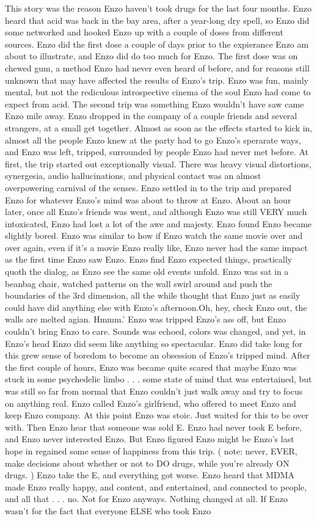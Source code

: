 \documentclass[12pt]{book}
\begin{document}
This story was the reason Enzo haven't took drugs for the last four months. Enzo heard that acid was back in the bay area, after a year-long dry spell, so Enzo did some networked and hooked Enzo up with a couple of doses from different sources. Enzo did the first dose a couple of days prior to the expierance Enzo am about to illustrate, and Enzo did do too much for Enzo. The first dose was on chewed gum, a method Enzo had never even heard of before, and for reasons still unknown that may have affected the results of Enzo's trip. Enzo was fun, mainly mental, but not the rediculous introspective cinema of the soul Enzo had come to expect from acid. The second trip was something Enzo wouldn't have saw came Enzo mile away. Enzo dropped in the company of a couple friends and several strangers, at a small get together. Almost as soon as the effects started to kick in, almost all the people Enzo knew at the party had to go Enzo's sperarate ways, and Enzo was left, tripped, surrounded by people Enzo had never met before. At first, the trip started out exceptionally visual. There was heavy visual distortions, synergesia, audio hallucinations, and physical contact was an almost overpowering carnival of the senses. Enzo settled in to the trip and prepared Enzo for whatever Enzo's mind was about to throw at Enzo. About an hour later, once all Enzo's friends was went, and although Enzo was still VERY much intoxicated, Enzo had lost a lot of the awe and majesty. Enzo found Enzo became slightly bored. Enzo was similar to how if Enzo watch the same movie over and over again, even if it's a movie Enzo really like, Enzo never had the same impact as the first time Enzo saw Enzo. Enzo find Enzo expected things, practically quoth the dialog, as Enzo see the same old events unfold. Enzo was sat in a beanbag chair, watched patterns on the wall swirl around and push the boundaries of the 3rd dimension, all the while thought that Enzo just as easily could have did anything else with Enzo's afternoon.Oh, hey, check Enzo out, the walls are melted agian. Hmmm.' Enzo was tripped Enzo's ass off, but Enzo couldn't bring Enzo to care. Sounds was echoed, colors was changed, and yet, in Enzo's head Enzo did seem like anything so spectacular. Enzo did take long for this grew sense of boredom to become an obsession of Enzo's tripped mind. After the first couple of hours, Enzo was became quite scared that maybe Enzo was stuck in some psychedelic limbo . . .  some state of mind that was entertained, but was still so far from normal that Enzo couldn't just walk away and try to focus on anything real. Enzo called Enzo's girlfriend, who offered to meet Enzo and keep Enzo company. At this point Enzo was stoic. Just waited for this to be over with. Then Enzo hear that someone was sold E. Enzo had never took E before, and Enzo never interested Enzo. But Enzo figured Enzo might be Enzo's last hope in regained some sense of happiness from this trip. ( note: never, EVER, make decisions about whether or not to DO drugs, while you're already ON drugs. ) Enzo take the E, and everything got worse. Enzo heard that MDMA made Enzo really happy, and content, and entertained, and connected to people, and all that . . .  no. Not for Enzo anyways. Nothing changed at all. If Enzo wasn't for the fact that everyone ELSE who took Enzo 
\end{document}
